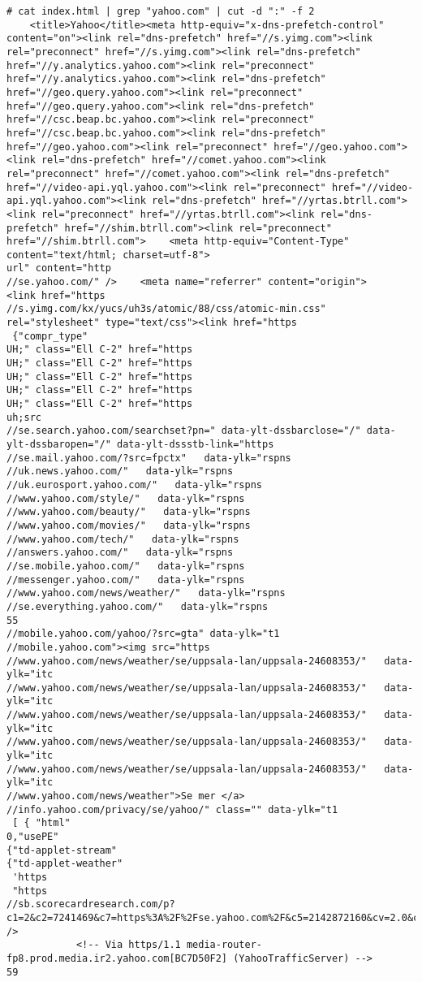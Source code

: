 \begin{lstlisting}[numbers=none, language={}, frame=bt]
# cat index.html | grep "yahoo.com" | cut -d ":" -f 2
    <title>Yahoo</title><meta http-equiv="x-dns-prefetch-control" content="on"><link rel="dns-prefetch" href="//s.yimg.com"><link rel="preconnect" href="//s.yimg.com"><link rel="dns-prefetch" href="//y.analytics.yahoo.com"><link rel="preconnect" href="//y.analytics.yahoo.com"><link rel="dns-prefetch" href="//geo.query.yahoo.com"><link rel="preconnect" href="//geo.query.yahoo.com"><link rel="dns-prefetch" href="//csc.beap.bc.yahoo.com"><link rel="preconnect" href="//csc.beap.bc.yahoo.com"><link rel="dns-prefetch" href="//geo.yahoo.com"><link rel="preconnect" href="//geo.yahoo.com"><link rel="dns-prefetch" href="//comet.yahoo.com"><link rel="preconnect" href="//comet.yahoo.com"><link rel="dns-prefetch" href="//video-api.yql.yahoo.com"><link rel="preconnect" href="//video-api.yql.yahoo.com"><link rel="dns-prefetch" href="//yrtas.btrll.com"><link rel="preconnect" href="//yrtas.btrll.com"><link rel="dns-prefetch" href="//shim.btrll.com"><link rel="preconnect" href="//shim.btrll.com">    <meta http-equiv="Content-Type" content="text/html; charset=utf-8">
url" content="http
//se.yahoo.com/" />    <meta name="referrer" content="origin">        <link href="https
//s.yimg.com/kx/yucs/uh3s/atomic/88/css/atomic-min.css" rel="stylesheet" type="text/css"><link href="https
 {"compr_type"
UH;" class="Ell C-2" href="https
UH;" class="Ell C-2" href="https
UH;" class="Ell C-2" href="https
UH;" class="Ell C-2" href="https
UH;" class="Ell C-2" href="https
uh;src
//se.search.yahoo.com/searchset?pn=" data-ylt-dssbarclose="/" data-ylt-dssbaropen="/" data-ylt-dssstb-link="https
//se.mail.yahoo.com/?src=fpctx"   data-ylk="rspns
//uk.news.yahoo.com/"   data-ylk="rspns
//uk.eurosport.yahoo.com/"   data-ylk="rspns
//www.yahoo.com/style/"   data-ylk="rspns
//www.yahoo.com/beauty/"   data-ylk="rspns
//www.yahoo.com/movies/"   data-ylk="rspns
//www.yahoo.com/tech/"   data-ylk="rspns
//answers.yahoo.com/"   data-ylk="rspns
//se.mobile.yahoo.com/"   data-ylk="rspns
//messenger.yahoo.com/"   data-ylk="rspns
//www.yahoo.com/news/weather/"   data-ylk="rspns
//se.everything.yahoo.com/"   data-ylk="rspns
55
//mobile.yahoo.com/yahoo/?src=gta" data-ylk="t1
//mobile.yahoo.com"><img src="https
//www.yahoo.com/news/weather/se/uppsala-lan/uppsala-24608353/"   data-ylk="itc
//www.yahoo.com/news/weather/se/uppsala-lan/uppsala-24608353/"   data-ylk="itc
//www.yahoo.com/news/weather/se/uppsala-lan/uppsala-24608353/"   data-ylk="itc
//www.yahoo.com/news/weather/se/uppsala-lan/uppsala-24608353/"   data-ylk="itc
//www.yahoo.com/news/weather/se/uppsala-lan/uppsala-24608353/"   data-ylk="itc
//www.yahoo.com/news/weather">Se mer </a>
//info.yahoo.com/privacy/se/yahoo/" class="" data-ylk="t1
 [ { "html"
0,"usePE"
{"td-applet-stream"
{"td-applet-weather"
 'https
 "https
//sb.scorecardresearch.com/p?c1=2&c2=7241469&c7=https%3A%2F%2Fse.yahoo.com%2F&c5=2142872160&cv=2.0&cj=1" />
            <!-- Via https/1.1 media-router-fp8.prod.media.ir2.yahoo.com[BC7D50F2] (YahooTrafficServer) -->
59
\end{lstlisting}
